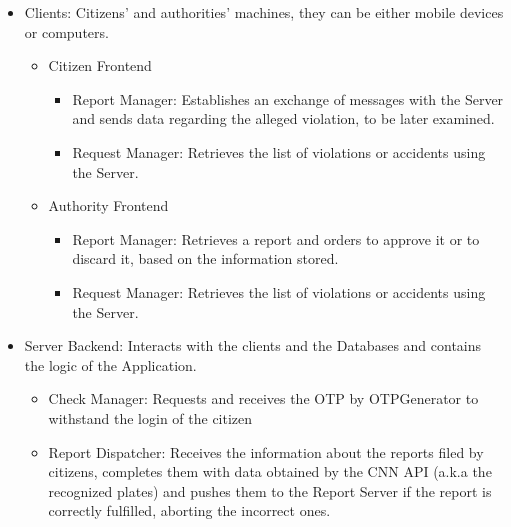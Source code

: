     \begin{itemize}

        \item Clients: Citizens' and authorities' machines, they can be either mobile devices or computers.
        
        \begin{itemize}

            \item Citizen Frontend

            \begin{itemize}

                \item Report Manager: Establishes an exchange of messages with the Server and sends data regarding the alleged violation, to be later examined.
                
                \item Request Manager: Retrieves the list of violations or accidents using the Server.
                
            \end{itemize}

            \item Authority Frontend

            \begin{itemize}

                \item Report Manager: Retrieves a report and orders to approve it or to discard it, based on the information stored.
                
                \item Request Manager: Retrieves the list of violations or accidents using the Server.
                
            \end{itemize}
            
        \end{itemize}

        \item Server Backend: Interacts with the clients and the Databases and contains the logic of the Application.
        
        \begin{itemize}
            \item Check Manager: Requests and receives the OTP by OTPGenerator to withstand the login of the citizen
            
            \item Report Dispatcher: Receives the information about the reports filed by citizens, completes them with data obtained by the CNN API 
                (a.k.a the recognized plates) and pushes them to the Report Server if the report is correctly fulfilled, aborting the incorrect ones.


\end{itemize}
\end{itemize}

